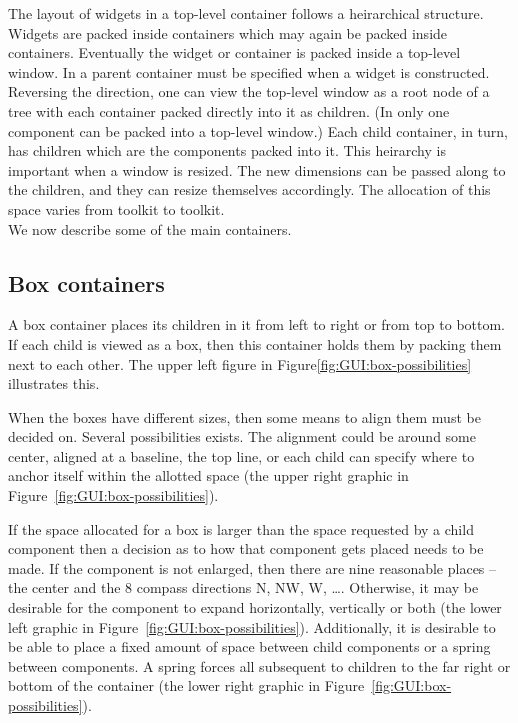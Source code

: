 The layout of widgets in a top-level container follows a heirarchical
structure. Widgets are packed inside containers which may again be
packed inside containers. Eventually the widget or container is packed
inside a top-level window. In  a
parent container must be specified when a widget is
constructed. Reversing the direction, one can view the top-level
window as a root node of a tree with each container packed directly
into it as children. (In  only one component can be packed
into a top-level window.) Each child container, in turn, has children
which are the components packed into it. This heirarchy is important
when a window is resized. The new dimensions can be passed along to
the children, and they can resize themselves accordingly. The
allocation of this space varies from toolkit to toolkit.  
\\

We now describe some of the main containers.


\subsection{Box containers}
\label{sec:GUI:Box-containers}

A box container places its children in it from left to right or from
top to bottom.  If each child is viewed as a box, then this container
holds them by packing them next to each other. The upper left figure in
Figure\ref{fig:GUI:box-possibilities} illustrates this. 

When the boxes have different sizes, then some means to align them
must be decided on. Several possibilities exists. The alignment could
be around some center, aligned at a baseline, the top line, or each
child can specify where to anchor itself within the allotted space
(the upper right graphic in Figure~\ref{fig:GUI:box-possibilities}).

If the space allocated for a box is larger than the space requested by
a child component then a decision as to how that component gets placed
needs to be made. If the component is not enlarged, then there are
nine reasonable places -- the center and the 8 compass directions N,
NW, W, \dots. Otherwise, it may be desirable for the component to
expand horizontally, vertically or both (the lower left graphic in
Figure~\ref{fig:GUI:box-possibilities}). Additionally, it is desirable
to be able to place a fixed amount of space between child components
or a spring between components. A spring forces all subsequent to
children to the far right or bottom of the container (the lower right
graphic in Figure~\ref{fig:GUI:box-possibilities}).


